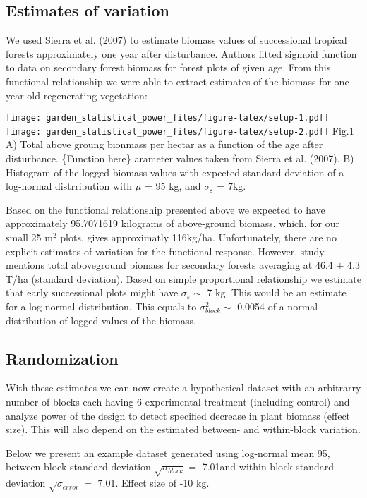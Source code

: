 \documentclass[]{article}
\begin{document}
\subsection{Estimates of variation}\label{estimates-of-variation}

We used Sierra et al. (2007) to estimate biomass values of successional
tropical forests approximately one year after disturbance. Authors
fitted sigmoid function to data on secondary forest biomass for forest
plots of given age. From this functional relationship we were able to
extract estimates of the biomass for one year old regenerating
vegetation:

\texttt{[image: garden\_statistical\_power\_files/figure-latex/setup-1.pdf]}
\texttt{[image: garden\_statistical\_power\_files/figure-latex/setup-2.pdf]}
Fig.1 A) Total above groung bionmass per hectar as a function of the age
after disturbance. \{Function here\} arameter values taken from Sierra
et al. (2007). B) Histogram of the logged biomass values with expected
standard deviation of a log-normal distrribution with \(\mu\) = 95 kg,
and \(\sigma_{\varepsilon}\) = 7kg.

Based on the functional relationship presented above we expected to have
approximately 95.7071619 kilograms of above-ground biomass. which, for
our small 25 m\(^2\) plots, gives approximatly 116kg/ha. Unfortunately,
there are no explicit estimates of variation for the functional
response. However, study mentions total aboveground biomass for
secondary forests averaging at 46.4 \(\pm\) 4.3 T/ha (standard
deviation). Based on simple proportional relationship we estimate that
early successional plots might have \(\sigma_{\varepsilon}\sim\) 7 kg.
This would be an estimate for a log-normal distribution. This equals to
\(\sigma^2_{block} \sim\) 0.0054 of a normal distribution of logged
values of the biomass.

\subsection{Randomization}\label{randomization}

With these estimates we can now create a hypothetical dataset with an
arbitrarry number of blocks each having 6 experimental treatment
(including control) and analyze power of the design to detect specified
decrease in plant biomass (effect size). This will also depend on the
estimated between- and within-block variation.

Below we present an example dataset generated using log-normal mean 95,
between-block standard deviation \(\sqrt{\sigma_{block}} =\) 7.01and
within-block standard deviation \(\sqrt{\sigma_{error}}=\) 7.01. Effect
size of -10 kg.
\end{document}

